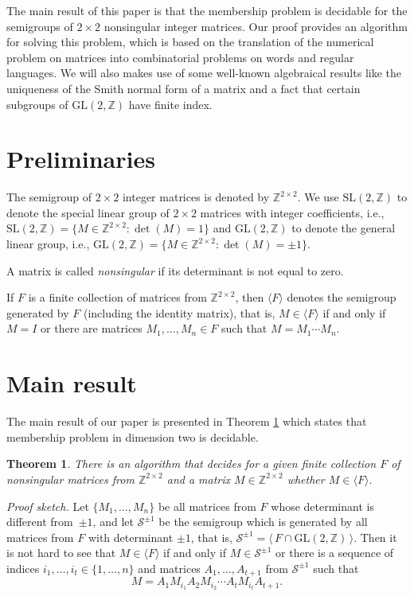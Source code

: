 \documentclass[fontsize=11pt,DIV=13,paper=letter]{scrartcl}
\newtheorem{theorem}{Theorem}\newtheorem{proposition}[theorem]{Proposition}
\theoremstyle{definition}
\newcommand{\la}{\langle}
\newcommand{\ra}{\rangle}
\newcommand{\Z}{\mathbb{Z}}
\newcommand{\s}{\mathcal{S}}
\newcommand{\SL}{\mathrm{SL}(2,\Z)}
\newcommand{\GL}{\mathrm{GL}(2,\Z)}
\begin{document}
The main result of this paper is that the membership problem is decidable
for the semigroups of $2 \times 2$ nonsingular integer matrices. Our proof provides an algorithm for solving this problem, which is
based on the translation of the numerical problem on matrices into combinatorial problems on words and regular languages. We will also makes use of some well-known algebraical results like the uniqueness of the Smith normal form of a matrix and a fact that certain subgroups of $\GL$ have finite index.


\section{Preliminaries}

The semigroup of $2\times 2$ integer matrices is denoted by $\Z^{2\times 2}$.
We use $\SL$ to denote the special linear group of $2\times 2$ matrices with integer coefficients, i.e., $\SL=\{M\in \Z^{2\times 2} : \det(M)=1\}$ and $\GL$ to denote the general linear group, i.e., $\GL=\{M\in \Z^{2\times 2} : \det(M)=\pm 1\}$.

A matrix is called \emph{nonsingular} if its determinant is not equal to zero.

If $F$ is a finite collection of matrices from $\Z^{2\times 2}$, then $\la F\ra$ denotes the semigroup generated by $F$ (including the identity matrix), that is, $M\in \la F\ra$ if and only if $M=I$ or there are matrices $M_1,\dots,M_n\in F$ such that $M=M_1\cdots M_n$.

\section{Main result}

The main result of our paper is presented in Theorem \ref{thm:mem} which states that membership problem in dimension two is decidable.

\begin{theorem} \label{thm:mem}
There is an algorithm that decides for a given finite collection $F$ of nonsingular matrices from $\Z^{2\times 2}$ and a matrix $M\in \Z^{2\times 2}$ whether $M\in \la F\ra$.
\end{theorem}

{\it Proof sketch.} Let $\{M_1,\dots,M_n\}$ be all matrices from $F$ whose determinant is different from~$\pm 1$, and let $\s^{\pm 1}$ be the semigroup which is generated by all matrices from $F$ with determinant $\pm 1$, that is, $\s^{\pm 1} = \la\, F\cap \GL\,\ra$. Then it is not hard to see that $M\in \la F\ra$ if and only if $M\in \s^{\pm 1}$ or there is a sequence of indices $i_1,\dots,i_t\in \{1,\dots,n\}$ and matrices $A_1,\dots,A_{t+1}$ from $\s^{\pm 1}$ such that
\[
M=A_1M_{i_1}A_2M_{i_2}\cdots A_tM_{i_t}A_{t+1}.
\]
\end{document}
